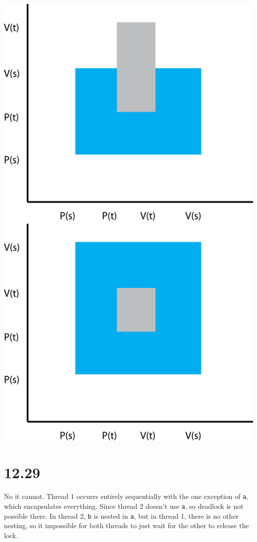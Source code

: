 \documentclass[fleqn]{article}
\begin{document}
\includegraphics[scale=0.25]{3.png}
\includegraphics[scale=0.25]{4.png}

\section*{12.29}

No it cannot. Thread 1 occurrs entirely sequentially with the one exception of \texttt{a}, which encapsulates everything. Since thread 2 doesn't use \texttt{a}, so deadlock is not possible there. In thread 2, \texttt{b} is nested in \texttt{a}, but in thread 1, there is no other nesting, so it impossible for both threads to just wait for the other to release the lock.
\end{document}
